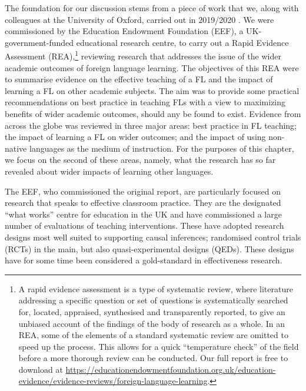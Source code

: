 \documentclass[output=paper]{langscibook}
\begin{document}
The foundation for our discussion stems from a piece of work that we, along with colleagues at the University of Oxford, carried out in 2019/2020 \citep{MurphyEtAl2020}. We were commissioned by the Education Endowment Foundation (EEF), a UK-government-funded educational research centre, to carry out a Rapid Evidence Assessment (REA),\footnote{A rapid evidence assessment is a type of systematic review, where literature addressing a specific question or set of questions is systematically searched for, located, appraised, synthesised and transparently reported, to give an unbiased account of the findings of the body of research as a whole. In an REA, some of the elements of a standard systematic review are omitted to speed up the process. This allows for a quick ``temperature check'' of the field before a more thorough review can be conducted. Our full report is free to download at \url{https://educationendowmentfoundation.org.uk/education-evidence/evidence-reviews/foreign-language-learning}.} reviewing research that addresses the issue of the wider academic outcomes of foreign language learning. The objectives of this REA were to summarise evidence on the effective teaching of a FL and the impact of learning a FL on other academic subjects. The aim was to provide some practical recommendations on best practice in teaching FLs with a view to maximizing benefits of wider academic outcomes, should any be found to exist. Evidence from across the globe was reviewed in three major areas: best practice in FL teaching; the impact of learning a FL on wider outcomes; and the impact of using non-native languages as the medium of instruction. For the purposes of this chapter, we focus on the second of these areas, namely, what the research has so far revealed about wider impacts of learning other languages. 

The EEF, who commissioned the original report, are particularly focused on research that speaks to effective classroom practice. They are the designated ``what works'' centre for education in the UK and have commissioned a large number of evaluations of teaching interventions. These have adopted research designs most well suited to supporting causal inferences; randomised control trials (RCTs) in the main, but also quasi-experimental designs (QEDs). These designs have for some time been considered a gold-standard in effectiveness research. 
\end{document}
